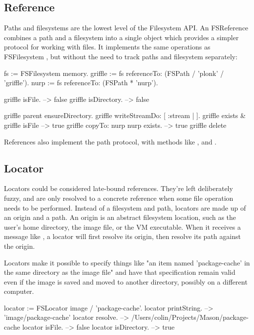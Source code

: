 \documentclass[a4paper,10pt,twoside]{book}
\begin{document}
\subsection{Reference}

Paths and filesystems are the lowest level of the Filesystem API. An FSReference combines a path and a filesystem into a single object which provides a simpler protocol for working with files. It implements the same operations as FSFilesystem , but without the need to track paths and filesystem separately:


\begin{code}{}
    fs := FSFilesystem memory.
    griffle := fs referenceTo: (FSPath / 'plonk' / 'griffle').
    nurp := fs referenceTo: (FSPath * 'nurp').
    
    griffle isFile.				--> false
    griffle isDirectory. 		--> false
    
    griffle parent ensureDirectory.
    griffle writeStreamDo: [ :stream | ].
    griffle exists & griffle isFile		--> true
    griffle copyTo: nurp
	nurp exists.				--> true
    griffle delete              
\end{code}    

References also implement the path protocol, with methods like \ct{/} ,  and .

\subsection{Locator}

Locators could be considered late-bound references. They're left deliberately fuzzy, and are only resolved to a concrete reference when some file operation needs to be performed. Instead of a filesystem and path, locators are made up of an origin and a path. An origin is an abstract filesystem location, such as the user's home directory, the image file, or the VM executable. When it receives a message like , a locator will first resolve its origin, then resolve its path against the origin.

Locators make it possible to specify things like "an item named 'package-cache' in the same directory as the image file" and have that specification remain valid even if the image is saved and moved to another directory, possibly on a different computer.

\begin{code}{}
    locator := FSLocator image / 'package-cache'.
    locator printString.             --> '{image}/package-cache'
    locator resolve.                 --> /Users/colin/Projects/Mason/package-cache
    locator isFile.                  --> false
    locator isDirectory.             --> true
\end{code}	
\end{document}
